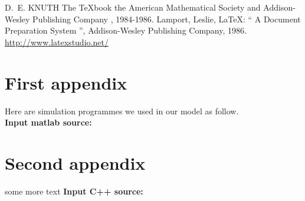 \documentclass[12pt]{article}
\begin{document}
\begin{thebibliography}{99}
 D.~E. KNUTH   The \TeX{}book  the American
Mathematical Society and Addison-Wesley
Publishing Company , 1984-1986.
Lamport, Leslie,  \LaTeX{}: `` A Document Preparation System '',
Addison-Wesley Publishing Company, 1986.
\url{http://www.latexstudio.net/}
\end{thebibliography}

\begin{appendices}

\section{First appendix}

\lipsum[13]

Here are simulation programmes we used in our model as follow.\\

\textbf{\textcolor[rgb]{0.98,0.00,0.00}{Input matlab source:}}


\section{Second appendix}

some more text \textcolor[rgb]{0.98,0.00,0.00}{\textbf{Input C++ source:}}


\end{appendices}
\end{document}
